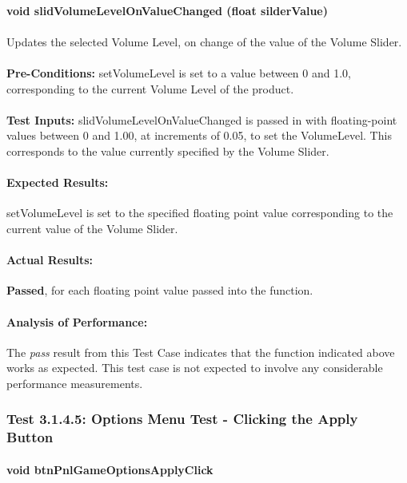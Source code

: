 \documentclass{article}
\begin{document}
    \paragraph{}\textbf{void slidVolumeLevelOnValueChanged (float silderValue)}
    \paragraph{} Updates the selected Volume Level, on change of the value of the Volume Slider.
    \paragraph{}\textbf{Pre-Conditions:} setVolumeLevel is set to a value between 0 and 1.0, corresponding to the current Volume Level of the product.
    \paragraph{}\textbf{Test Inputs:} slidVolumeLevelOnValueChanged is passed in with floating-point values between 0 and 1.00, at increments of 0.05, to set the VolumeLevel. This corresponds to the value currently specified by the Volume Slider.
    \paragraph{Expected Results:} setVolumeLevel is set to the specified floating point value corresponding to the current value of the Volume Slider.
    \paragraph{Actual Results:} \textbf{Passed}, for each floating point value passed into the function.
    \paragraph{Analysis of Performance:} The \emph{pass} result from this Test Case indicates that the function indicated above works as expected. This test case is not expected to involve any considerable performance measurements.
    
     \subsubsection{Test 3.1.4.5: Options Menu Test - Clicking the Apply Button}
    \paragraph{}\textbf{void btnPnlGameOptionsApplyClick}
\end{document}
